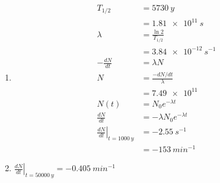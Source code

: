 \documentclass{article}
\begin{document}
\begin{enumerate}
  \item

        \begin{align*}
          T_{1 / 2}                                          & = \qty{5730}{y}               \\
                                                             & = \qty{1.81e11}{s}            \\
          \lambda                                            & = \frac{\ln 2}{T_{1 / 2}}     \\
                                                             & = \qty{3.84e-12}{s^{-1}}      \\
          -\frac{d N}{d t}                                   & = \lambda N                   \\
          N                                                  & = \frac{-d N / d t}{\lambda}  \\
                                                             & = \num{7.49e11}               \\
          N(t)                                               & = N_0 e^{-\lambda t}          \\
          \frac{d N}{d t}                                    & = -\lambda N_0 e^{-\lambda t} \\
          \left. \frac{d N}{d t} \right|_{t = \qty{1000}{y}} & = \qty{-2.55}{s^{-1}}         \\
                                                             & = \qty{-153}{min^{-1}}
        \end{align*}

  \item $\left. \frac{d N}{d t} \right|_{t = \qty{50000}{y}} = \qty{-0.405}{min^{-1}}$
\end{enumerate}

\setcounter{subsubsection}{24}
\subsubsection{}
\end{document}
